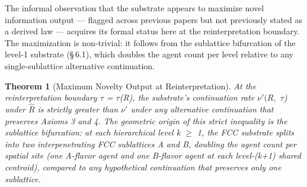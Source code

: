 \documentclass[11pt,oneside]{report}
\newtheorem{theorem}{Theorem}[section]
\theoremstyle{definition}
\theoremstyle{remark}
\begin{document}
The informal observation that the substrate appears to maximize novel
information output --- flagged across previous papers but not previously
stated as a derived law --- acquires its formal status here at the
reinterpretation boundary. The maximization is non-trivial: it follows
from the sublattice bifurcation of the level-1 substrate (\S\,6.1), which
doubles the agent count per level relative to any single-sublattice
alternative continuation.

\begin{theorem}[Maximum Novelty Output at Reinterpretation]
\emph{At
the reinterpretation boundary \ensuremath{\tau} = \ensuremath{\tau}}(R), the substrate's continuation
rate \ensuremath{\nu '(R,} \ensuremath{\tau}\emph{) under \ensuremath{\hat{R}} is strictly greater than \ensuremath{\nu '} under any
alternative continuation that preserves Axioms 3 and 4. The geometric
origin of this strict inequality is the sublattice bifurcation: at each
hierarchical level k \ensuremath{\geq} 1, the FCC substrate splits into two
interpenetrating FCC sublattices A and B, doubling the agent count per
spatial site (one A-flavor agent and one B-flavor agent at each
level-(k+1) shared centroid), compared to any hypothetical continuation
that preserves only one sublattice.}
\end{theorem}
\end{document}
